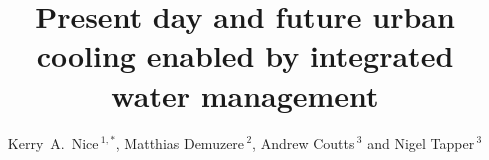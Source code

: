 \documentclass[utf8]{frontiersSCNS} %
\def\firstAuthorLast{Nice {et~al.}} %
\def\Authors{Kerry~A.~Nice\,$^{1,*}$, Matthias Demuzere\,$^{2}$, Andrew Coutts\,$^{3}$ and Nigel Tapper\,$^{3}$}
\begin{document}
\onecolumn
{}

\title[Present day and future urban cooling enabled by integrated water management in Australia]{Present day and future urban cooling enabled by integrated water management} 

\author[\firstAuthorLast ]{\Authors} %
\address{} %
\correspondance{} %

\extraAuth{}%


\maketitle
\end{document}
